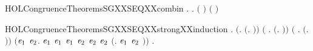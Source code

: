 \newcommand{\HOLCongruenceTheoremsSGXXrules}{\UseVerbatim{HOLCongruenceTheoremsSGXXrules}}
\begin{SaveVerbatim}{HOLCongruenceTheoremsSGXXSEQXXcombin}
\HOLTokenTurnstile{} \HOLSymConst{\HOLTokenForall{}}.   \HOLSymConst{\HOLTokenConj{}}   \HOLSymConst{\HOLTokenImp{}} \HOLSymConst{\HOLTokenForall{}}.   \HOLSymConst{\HOLTokenImp{}}  \ensuremath{(} \HOLConst{\HOLTokenCompose} \ensuremath{)} \HOLSymConst{\HOLTokenConj{}}  \ensuremath{(} \HOLConst{\HOLTokenCompose} \ensuremath{)}
\end{SaveVerbatim}
\newcommand{\HOLCongruenceTheoremsSGXXSEQXXcombin}{\UseVerbatim{HOLCongruenceTheoremsSGXXSEQXXcombin}}
\begin{SaveVerbatim}{HOLCongruenceTheoremsSGXXSEQXXstrongXXinduction}
\HOLTokenTurnstile{} \HOLSymConst{\HOLTokenForall{}}.
       \ensuremath{(}\HOLSymConst{\HOLTokenForall{}}.  \ensuremath{(}\HOLTokenLambda{}. \ensuremath{)}\ensuremath{)} \HOLSymConst{\HOLTokenConj{}} \ensuremath{(}\HOLSymConst{\HOLTokenForall{}} .   \HOLSymConst{\HOLTokenImp{}}  \ensuremath{(}\HOLTokenLambda{}.  \HOLSymConst{\ensuremath{\ldotp}} \ensuremath{)}\ensuremath{)} \HOLSymConst{\HOLTokenConj{}}
       \ensuremath{(}\HOLSymConst{\HOLTokenForall{}} .   \HOLSymConst{\HOLTokenConj{}}   \HOLSymConst{\HOLTokenConj{}}   \HOLSymConst{\HOLTokenImp{}}  \ensuremath{(}\HOLTokenLambda{}. \HOLSymConst{\ensuremath{\ldotp}} \ensuremath{)}\ensuremath{)} \HOLSymConst{\HOLTokenConj{}}
       \ensuremath{(}\HOLSymConst{\HOLTokenForall{}}\ensuremath{\HOLBoundVar{e}\sb{\mathrm{1}}} \ensuremath{\HOLBoundVar{e}\sb{\mathrm{2}}}.
             \ensuremath{\HOLBoundVar{e}\sb{\mathrm{1}}} \HOLSymConst{\HOLTokenConj{}}  \ensuremath{\HOLBoundVar{e}\sb{\mathrm{1}}} \HOLSymConst{\HOLTokenConj{}}  \ensuremath{\HOLBoundVar{e}\sb{\mathrm{1}}} \HOLSymConst{\HOLTokenConj{}}  \ensuremath{\HOLBoundVar{e}\sb{\mathrm{2}}} \HOLSymConst{\HOLTokenConj{}}  \ensuremath{\HOLBoundVar{e}\sb{\mathrm{2}}} \HOLSymConst{\HOLTokenConj{}}  \ensuremath{\HOLBoundVar{e}\sb{\mathrm{2}}} \HOLSymConst{\HOLTokenImp{}}
             \ensuremath{(}\HOLTokenLambda{}. \ensuremath{\HOLBoundVar{e}\sb{\mathrm{1}}}  \HOLSymConst{\ensuremath{+}} \ensuremath{\HOLBoundVar{e}\sb{\mathrm{2}}} \ensuremath{)}\ensuremath{)} \HOLSymConst{\HOLTokenImp{}}
       \HOLSymConst{\HOLTokenForall{}}.   \HOLSymConst{\HOLTokenConj{}}   \HOLSymConst{\HOLTokenImp{}}  
\end{SaveVerbatim}
